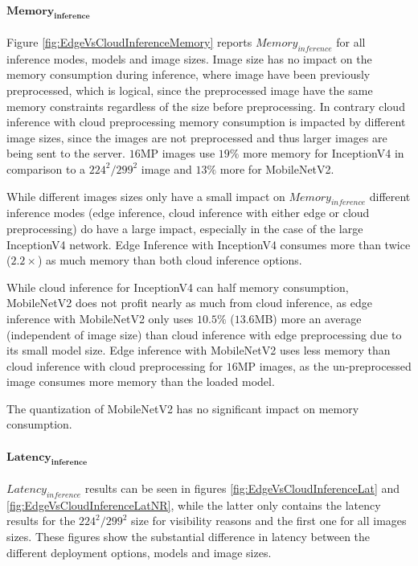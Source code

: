\paragraph{$\mathbf{Memory_{inference}}$}
Figure \ref{fig:EdgeVsCloudInferenceMemory} reports $Memory_{inference}$ for all inference modes, models and image sizes.
Image size has no impact on the memory consumption during inference, where image have been previously preprocessed, which is logical, since the preprocessed image have the same memory constraints regardless of the size before preprocessing.
In contrary cloud inference with cloud preprocessing memory consumption is impacted by different image sizes, since the images are not preprocessed and thus larger images are being sent to the server.
$16$MP images use $19\%$ more memory for InceptionV4 in comparison to a $224^2/299^2$ image and $13\%$ more for MobileNetV2.


While different images sizes only have a small impact on $Memory_{inference}$ different inference modes (edge inference, cloud inference with either edge or cloud preprocessing) do have a large impact, especially in the case of the large InceptionV4 network.
Edge Inference with InceptionV4 consumes more than twice ($2.2\times$) as much memory than both cloud inference options.

While cloud inference for InceptionV4 can half memory consumption, MobileNetV2 does not profit nearly as much from cloud inference, as edge inference with MobileNetV2 only uses $10.5\%$ ($13.6$MB) more an average (independent of image size) than cloud inference with edge preprocessing due to its small model size.
Edge inference with MobileNetV2 uses less memory than cloud inference with cloud preprocessing for $16$MP images, as the un-preprocessed image consumes more memory than the loaded model. 

The quantization of MobileNetV2 has no significant impact on memory consumption.


\paragraph{$\mathbf{Latency_{inference}}$}
$Latency_{inference}$ results can be seen in figures \ref{fig:EdgeVsCloudInferenceLat} and \ref{fig:EdgeVsCloudInferenceLatNR}, while the latter only contains the latency results for the $224^2/299^2$ size for visibility reasons and the first one for all images sizes.
These figures show the substantial difference in latency between the different deployment options, models and image sizes.

